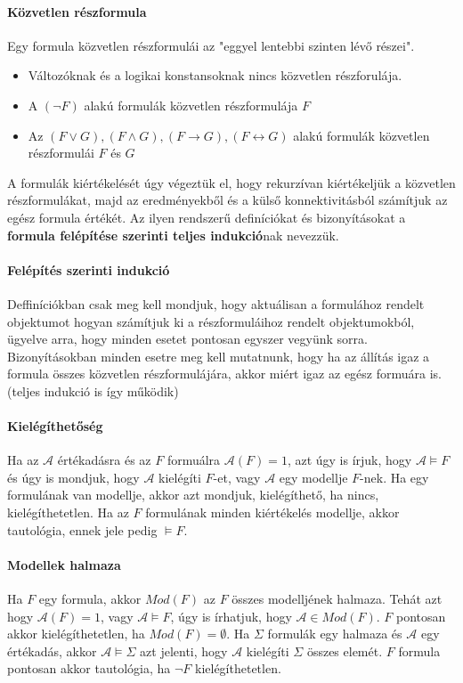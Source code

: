 \documentclass[10pt,a4paper]{article}
\begin{document}
\paragraph{Közvetlen részformula}
Egy formula közvetlen részformulái az "eggyel lentebbi szinten lévő részei". 
\begin{itemize}
\item Változóknak és a logikai konstansoknak nincs közvetlen részforulája.
\item A $(\neg F)$ alakú formulák közvetlen részformulája $F$
\item Az $(F \vee G), (F \wedge G), (F \rightarrow G), (F \leftrightarrow G)$ alakú formulák közvetlen részformulái  $F$ és $G$
\end{itemize}
A formulák kiértékelését úgy végeztük el, hogy rekurzívan kiértékeljük a közvetlen részformulákat, majd az eredményekből és a külső konnektivitásból számítjuk az egész formula értékét. Az ilyen rendszerű definíciókat és bizonyításokat a \textbf{formula felépítése szerinti teljes indukció}nak nevezzük.
\paragraph{Felépítés szerinti indukció}
Deffiníciókban csak meg kell mondjuk, hogy aktuálisan a formulához rendelt objektumot hogyan számítjuk ki a részformuláihoz rendelt objektumokból, ügyelve arra, hogy minden esetet pontosan egyszer vegyünk sorra. \newline
Bizonyításokban minden esetre meg kell mutatnunk, hogy ha az állítás igaz a formula összes közvetlen részformulájára, akkor miért igaz az egész formuára is. (teljes indukció is így működik)
\paragraph{Kielégíthetőség}
Ha az $\mathcal{A}$ értékadásra és az $F$ formuálra $\mathcal{A}(F)=1$, azt úgy is írjuk, hogy $\mathcal{A}\models F$ és úgy is mondjuk, hogy $\mathcal{A}$ kielégíti $F$-et, vagy $\mathcal{A}$ egy modellje $F$-nek. Ha egy formulának van modellje, akkor azt mondjuk, kielégíthető, ha nincs, kielégíthetetlen. Ha az $F$ formulának minden kiértékelés modellje, akkor tautológia, ennek jele pedig $\models F$.
\paragraph{Modellek halmaza}
Ha $F$ egy formula, akkor $Mod(F)$ az $F$ összes modelljének halmaza. Tehát azt hogy $\mathcal{A}(F)=1$, vagy $\mathcal{A} \models F$, úgy is írhatjuk, hogy $\mathcal{A}\in Mod(F)$. $F$ pontosan akkor kielégíthetetlen, ha $Mod(F)=\emptyset$. Ha $\Sigma$ formulák egy halmaza és $\mathcal{A}$ egy értékadás, akkor $\mathcal{A} \models \Sigma$ azt jelenti, hogy $\mathcal{A}$ kielégíti $\Sigma$ összes elemét. $F$ formula pontosan akkor tautológia, ha $\neg F$ kielégíthetetlen.
\end{document}
